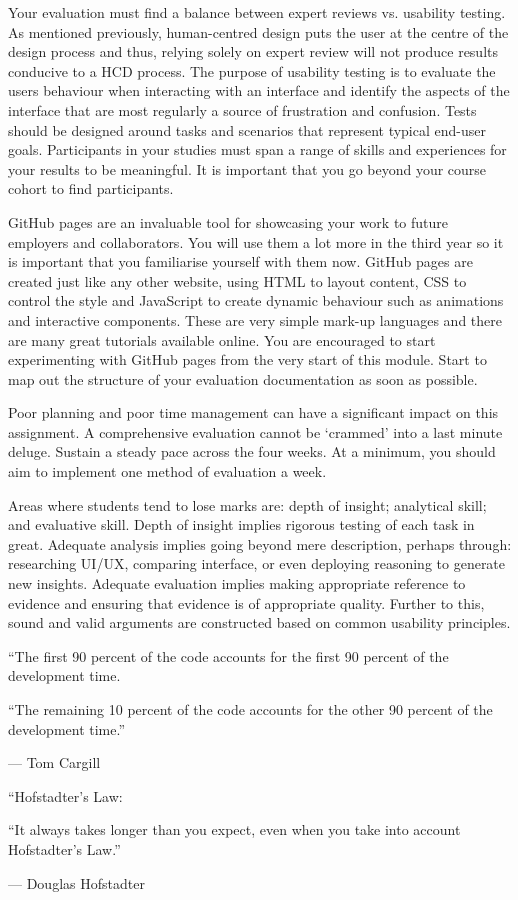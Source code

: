 \documentclass{../fal_assignment}
\begin{document}
Your evaluation must find a balance between expert reviews vs. usability testing. As mentioned previously, human-centred design puts the user at the centre of the design process and thus, relying solely on expert review will not produce results conducive to a HCD process. The purpose of usability testing is to evaluate the users behaviour when interacting with an interface and identify the aspects of the interface that are most regularly a source of frustration and confusion. Tests should be designed around tasks and scenarios that represent typical end-user goals. Participants in your studies must span a range of skills and experiences for your results to be meaningful. It is important that you go beyond your course cohort to find participants. 

GitHub pages are an invaluable tool for showcasing your work to future employers and collaborators. You will use them a lot more in the third year so it is important that you familiarise yourself with them now. GitHub pages are created just like any other website, using HTML to layout content, CSS to control the style and JavaScript to create dynamic behaviour such as animations and interactive components. These are very simple mark-up languages and there are many great tutorials available online. You are encouraged to start experimenting with GitHub pages from the very start of this module. Start to map out the structure of your evaluation documentation as soon as possible.  

Poor planning and poor time management can have a significant impact on this assignment. A comprehensive evaluation cannot be `crammed' into a last minute deluge. Sustain a steady pace across the four weeks. At a minimum, you should aim to implement one method of evaluation a week.

Areas where students tend to lose marks are: depth of insight; analytical skill; and evaluative skill. Depth of insight implies rigorous testing of each task in great. Adequate analysis implies going beyond mere description, perhaps through: researching UI/UX, comparing interface, or even deploying reasoning to generate new insights. Adequate evaluation implies making appropriate reference to evidence and ensuring that evidence is of appropriate quality. Further to this, sound and valid arguments are constructed based on common usability principles. 

\begin{marginquote}
    ``The first 90 percent of the code accounts for the first 90 percent of the development time.
    
    ``The remaining 10 percent of the code accounts for the other 90 percent of the development time.''
    
    --- Tom Cargill
    
    \marginquoterule
    
    ``Hofstadter's Law:
    
    ``It always takes longer than you expect, even when you take into account Hofstadter's Law.''
    
    --- Douglas Hofstadter
\end{marginquote}
\end{document}
